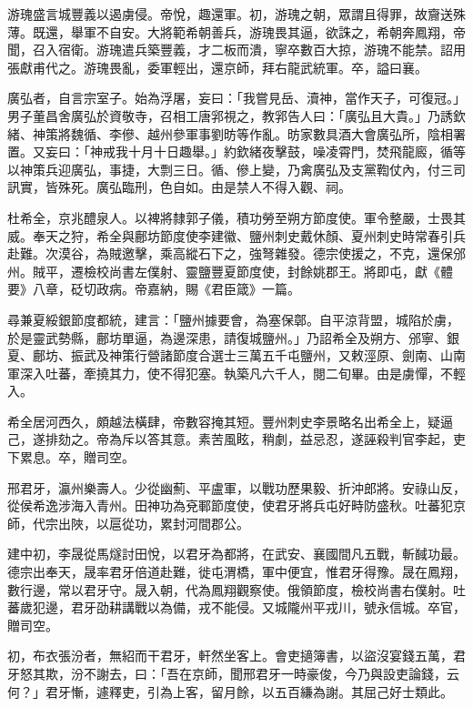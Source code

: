 \begin{pinyinscope}
 游瑰盛言城豐義以遏虜侵。帝悅，趣還軍。初，游瑰之朝，眾謂且得罪，故齎送殊薄。既還，舉軍不自安。大將範希朝善兵，游瑰畏其逼，欲誅之，希朝奔鳳翔，帝聞，召入宿衛。游瑰遣兵築豐義，才二板而潰，寧卒數百大掠，游瑰不能禁。詔用張獻甫代之。游瑰畏亂，委軍輕出，還京師，拜右龍武統軍。卒，謚曰襄。



 廣弘者，自言宗室子。始為浮屠，妄曰：「我嘗見岳、瀆神，當作天子，可復冠。」男子董昌舍廣弘於資敬寺，召相工唐郛視之，教郛告人曰：「廣弘且大貴。」乃誘欽緒、神策將魏循、李傪、越州參軍事劉昉等作亂。昉家數具酒大會廣弘所，陰相署置。又妄曰：「神戒我十月十日趣舉。」約欽緒夜擊鼓，噪凌霄門，焚飛龍廄，循等以神策兵迎廣弘，事捷，大剽三日。循、傪上變，乃禽廣弘及支黨鞫仗內，付三司訊實，皆殊死。廣弘臨刑，色自如。由是禁人不得入觀、祠。



 杜希全，京兆醴泉人。以裨將隸郭子儀，積功勞至朔方節度使。軍令整嚴，士畏其威。奉天之狩，希全與鄜坊節度使李建徽、鹽州刺史戴休顏、夏州刺史時常春引兵赴難。次漠谷，為賊邀擊，乘高縱石下之，強弩雜發。德宗使援之，不克，還保邠州。賊平，遷檢校尚書左僕射、靈鹽豐夏節度使，封餘姚郡王。將即屯，獻《體要》八章，砭切政病。帝嘉納，賜《君臣箴》一篇。



 尋兼夏綏銀節度都統，建言：「鹽州據要會，為塞保鄣。自平涼背盟，城陷於虜，於是靈武勢縣，鄜坊單逼，為邊深患，請復城鹽州。」乃詔希全及朔方、邠寧、銀夏、鄜坊、振武及神策行營諸節度合選士三萬五千屯鹽州，又敕涇原、劍南、山南軍深入吐蕃，牽撓其力，使不得犯塞。執築凡六千人，閱二旬畢。由是虜憚，不輕入。



 希全居河西久，頗越法橫肆，帝數容掩其短。豐州刺史李景略名出希全上，疑逼己，遂排劾之。帝為斥以答其意。素苦風眩，稍劇，益忌忍，遂誣殺判官李起，吏下累息。卒，贈司空。



 邢君牙，瀛州樂壽人。少從幽薊、平盧軍，以戰功歷果毅、折沖郎將。安祿山反，從侯希逸涉海入青州。田神功為兗鄆節度使，使君牙將兵屯好畤防盛秋。吐蕃犯京師，代宗出陜，以扈從功，累封河間郡公。



 建中初，李晟從馬燧討田悅，以君牙為都將，在武安、襄國間凡五戰，斬馘功最。德宗出奉天，晟率君牙倍道赴難，徙屯渭橋，軍中便宜，惟君牙得豫。晟在鳳翔，數行邊，常以君牙守。晟入朝，代為鳳翔觀察使。俄領節度，檢校尚書右僕射。吐蕃歲犯邊，君牙劭耕講戰以為備，戎不能侵。又城隴州平戎川，號永信城。卒官，贈司空。



 初，布衣張汾者，無紹而干君牙，軒然坐客上。會吏擿簿書，以盜沒宴錢五萬，君牙怒其欺，汾不謝去，曰：「吾在京師，聞邢君牙一時豪俊，今乃與設吏論錢，云何？」君牙慚，遽釋吏，引為上客，留月餘，以五百縑為謝。其屈己好士類此。



\end{pinyinscope}